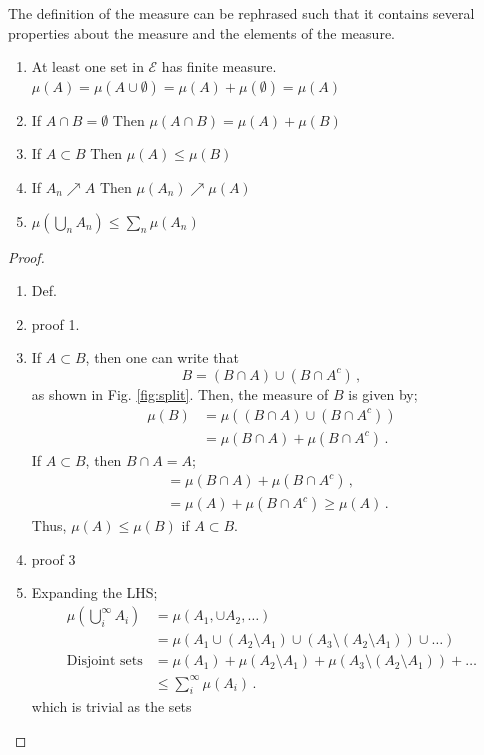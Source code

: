 The definition of the measure can be rephrased such that it contains several properties about the measure and the elements of the measure. 
\begin{enumerate}
	\item At least one set in $\mathcal{E}$ has finite measure. $\mu(A) = \mu(A \cup \emptyset) = \mu(A) + \mu(\emptyset) = \mu(A)$
	\item If $A\cap B = \emptyset$ Then $\mu(A\cap B) = \mu(A) + \mu(B)$
	\item If $A\subset B$ Then $\mu(A) \leq \mu(B)$
	\item If $A_n \nearrow A$ Then $\mu(A_n) \nearrow \mu(A)$
	\item $\mu\left(\bigcup_n A_n\right) \leq \sum_n \mu(A_n)$ 
\end{enumerate}
\begin{proof}
	\begin{enumerate}
		\item Def.
		\item proof 1.
		\item If $A\subset B$, then one can write that 
		\begin{equation}
			B = (B \cap A)\cup(B\cap A^c)\,,
		\end{equation}
		as shown in Fig. \ref{fig:split}. Then, the measure of $B$ is given by;
		\begin{align*}
			\mu(B) &= \mu((B \cap A)\cup(B\cap A^c)) \\
			&= \mu(B \cap A) + \mu(B\cap A^c)\,.
		\end{align*}
		If $A\subset B$, then $B \cap A = A$;
		\begin{align*}
			&= \mu(B \cap A) + \mu(B\cap A^c)\,, \\
			&= \mu(A) + \mu(B\cap A^c) \geq \mu(A)\,.
		\end{align*}
		Thus, $\mu(A) \leq \mu(B)$ if $A \subset B$.
		\item proof 3
		\item Expanding the LHS;
		\begin{align*}
			\mu\left(\bigcup_{i}^\infty A_i\right) &= \mu(A_1, \cup A_2, \dots)\\
			&= \mu(A_1 \cup (A_2\setminus A_1) \cup (A_3\setminus (A_2\setminus A_1))\cup \dots)\\
			\text{Disjoint sets} &= \mu(A_1) + \mu(A_2\setminus A_1) + \mu(A_3\setminus (A_2\setminus A_1)) + \dots \\
			&\leq \sum_{i}^{\infty} \mu(A_i)\,.
		\end{align*}
		which is trivial as the sets 
	\end{enumerate}
\end{proof}

